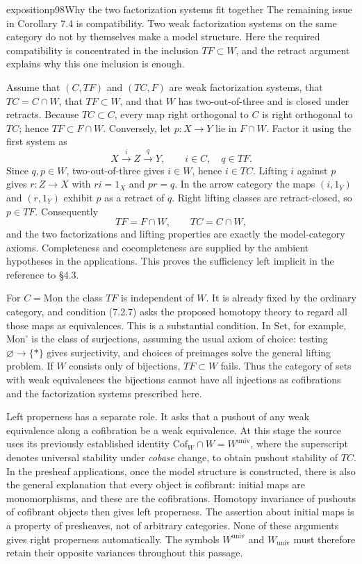 \begin{dcomment}{exposition}{p98}{Why the two factorization systems fit together}
The remaining issue in Corollary 7.4 is compatibility. Two weak factorization systems on the same category do not by themselves make a model structure. Here the required compatibility is concentrated in the inclusion $TF\subset W$, and the retract argument explains why this one inclusion is enough.

Assume that $(C,TF)$ and $(TC,F)$ are weak factorization systems, that $TC=C\cap W$, that $TF\subset W$, and that $W$ has two-out-of-three and is closed under retracts. Because $TC\subset C$, every map right orthogonal to $C$ is right orthogonal to $TC$; hence $TF\subset F\cap W$. Conversely, let $p:X\to Y$ lie in $F\cap W$. Factor it using the first system as
\[
 X\xrightarrow{i}Z\xrightarrow{q}Y,
 \qquad i\in C,\quad q\in TF.
\]
Since $q,p\in W$, two-out-of-three gives $i\in W$, hence $i\in TC$. Lifting $i$ against $p$ gives $r:Z\to X$ with $ri=1_X$ and $pr=q$. In the arrow category the maps $(i,1_Y)$ and $(r,1_Y)$ exhibit $p$ as a retract of $q$. Right lifting classes are retract-closed, so $p\in TF$. Consequently
\[
 TF=F\cap W,\qquad TC=C\cap W,
\]
and the two factorizations and lifting properties are exactly the model-category axioms. Completeness and cocompleteness are supplied by the ambient hypotheses in the applications. This proves the sufficiency left implicit in the reference to \S4.3.

For $C=\mathrm{Mon}$ the class $TF$ is independent of $W$. It is already fixed by the ordinary category, and condition (7.2.7) asks the proposed homotopy theory to regard all those maps as equivalences. This is a substantial condition. In $\mathrm{Set}$, for example, $\mathrm{Mon}^{\square}$ is the class of surjections, assuming the usual axiom of choice: testing $\varnothing\to\{*\}$ gives surjectivity, and choices of preimages solve the general lifting problem. If $W$ consists only of bijections, $TF\subset W$ fails. Thus the category of sets with weak equivalences the bijections cannot have all injections as cofibrations and the factorization systems prescribed here.

Left properness has a separate role. It asks that a pushout of any weak equivalence along a cofibration be a weak equivalence. At this stage the source uses its previously established identity $\mathrm{Cof}_W\cap W=W^{\mathrm{univ}}$, where the superscript denotes universal stability under \emph{cobase} change, to obtain pushout stability of $TC$. In the presheaf applications, once the model structure is constructed, there is also the general explanation that every object is cofibrant: initial maps are monomorphisms, and these are the cofibrations. Homotopy invariance of pushouts of cofibrant objects then gives left properness. The assertion about initial maps is a property of presheaves, not of arbitrary categories. None of these arguments gives right properness automatically. The symbols $W^{\mathrm{univ}}$ and $W_{\mathrm{univ}}$ must therefore retain their opposite variances throughout this passage.
\end{dcomment}

